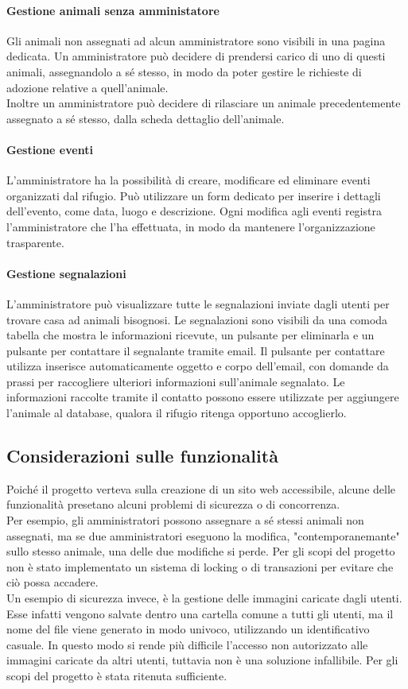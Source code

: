 \paragraph{Gestione animali senza amministatore}
Gli animali non assegnati ad alcun amministratore sono visibili in una pagina dedicata. Un amministratore può decidere di prendersi carico di uno di questi animali, assegnandolo a sé stesso, in modo da poter gestire le richieste di adozione relative a quell'animale.\\
Inoltre un amministratore può decidere di rilasciare un animale precedentemente assegnato a sé stesso, dalla scheda dettaglio dell'animale.
\paragraph{Gestione eventi}
L'amministratore ha la possibilità di creare, modificare ed eliminare eventi organizzati dal rifugio. Può utilizzare un form dedicato per inserire i dettagli dell'evento, come data, luogo e descrizione.
Ogni modifica agli eventi registra l'amministratore che l'ha effettuata, in modo da mantenere l'organizzazione trasparente.
\paragraph{Gestione segnalazioni}
L'amministratore può visualizzare tutte le segnalazioni inviate dagli utenti per trovare casa ad animali bisognosi. Le segnalazioni sono visibili da una comoda tabella che mostra le informazioni ricevute, un pulsante per eliminarla e un pulsante per contattare il segnalante tramite email.
Il pulsante per contattare utilizza inserisce automaticamente oggetto e corpo dell'email, con domande da prassi per raccogliere ulteriori informazioni sull'animale segnalato.
Le informazioni raccolte tramite il contatto possono essere utilizzate per aggiungere l'animale al database, qualora il rifugio ritenga opportuno accoglierlo.
\subsection{Considerazioni sulle funzionalità}
Poiché il progetto verteva sulla creazione di un sito web accessibile, alcune delle funzionalità presetano alcuni problemi di sicurezza o di concorrenza.\\
Per esempio, gli amministratori possono assegnare a sé stessi animali non assegnati, ma se due amministratori eseguono la modifica, "contemporanemante" sullo stesso animale, una delle due modifiche si perde. Per gli scopi del progetto non è stato implementato un sistema di locking o di transazioni per evitare che ciò possa accadere.\\
Un esempio di sicurezza invece, è la gestione delle immagini caricate dagli utenti. Esse infatti vengono salvate dentro una cartella comune a tutti gli utenti, ma il nome del file viene generato in modo univoco, utilizzando un identificativo casuale. In questo modo si rende più difficile l'accesso non autorizzato alle immagini caricate da altri utenti, tuttavia non è una soluzione infallibile. Per gli scopi del progetto è stata ritenuta sufficiente.\\